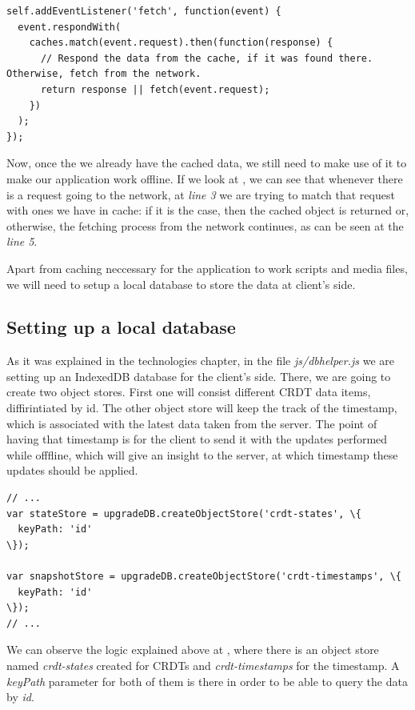 \begin{lstlisting}[caption={Code for maintaining the requests of the application.}, label={lst:dev5}]
self.addEventListener('fetch', function(event) {
  event.respondWith(
    caches.match(event.request).then(function(response) {
      // Respond the data from the cache, if it was found there. Otherwise, fetch from the network.
      return response || fetch(event.request);
    })
  );
});
\end{lstlisting}

Now, once the we already have the cached data, we still need to make use of it to make our application work offline. If we look at , we can see that whenever there is a request going to the network, at \textit{line 3} we are trying to match that request with ones we have in cache: if it is the case, then the cached object is returned or, otherwise, the fetching process from the network continues, as can be seen at the \textit{line 5}.

Apart from caching neccessary for the application to work scripts and media files, we will need to setup a local database to store the data at client's side.

\subsection*{Setting up a local database}

As it was explained in the technologies chapter, in the file \textit{js/dbhelper.js} we are setting up an IndexedDB database for the client's side. There, we are going to create two object stores. First one will consist different CRDT data items, diffirintiated by id. The other object store will keep the track of the timestamp, which is associated with the latest data taken from the server. The point of having that timestamp is for the client to send it with the updates performed while offfline, which will give an insight to the server, at which timestamp these updates should be applied.

\begin{lstlisting}[caption={Creating object stores in IndexedDB for CRDTs and timestamps.}, label={lst:dev6}]
// ...
var stateStore = upgradeDB.createObjectStore('crdt-states', \{
  keyPath: 'id'
\});

var snapshotStore = upgradeDB.createObjectStore('crdt-timestamps', \{
  keyPath: 'id'
\});
// ...
\end{lstlisting}

We can observe the logic explained above at , where there is an object store named \textit{crdt-states} created for CRDTs and \textit{crdt-timestamps} for the timestamp. A \textit{keyPath} parameter for both of them is there in order to be able to query the data by \textit{id}.

